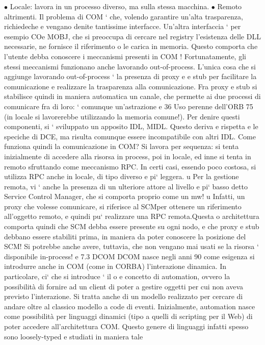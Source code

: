 \documentclass[a4paper,12pt]{article}
\begin{document}
$\bullet$ Locale: lavora in un processo diverso, ma sulla stessa macchina.
$\bullet$ Remoto altrimenti.
Il problema di COM ` che, volendo garantire un'alta trasparenza, richiedeche
e
vengano denite tantissime interfacce. Un'altra interfaccia ` per esempio COe
MOBJ, che si preoccupa di cercare nel registry l'esistenza delle DLL necessarie,
ne fornisce il riferimento o le carica in memoria. Questo comporta che l'utente debba conoscere i meccanismi presenti in
COM ! Fortunatamente, gli stessi
meccanismi funzionano anche lavorando out-of-process.
L'unica cosa che si aggiunge lavorando out-of-process ` la presenza di proxy
e
e stub per facilitare la comunicazione e realizzare la trasparenza alla comunicazione. Fra proxy e stub si stabilisce
quindi in maniera automatica un canale,
che permette ai due processi di comunicare fra di loro: ` comunque un'astrazione
e
36 Uso
perenne dell'ORB
75
(in locale si lavorerebbe utilizzando la memoria comune!). Per denire questi
componenti, si ` sviluppato un apposito IDL, MIDL. Questo deriva e rispetta
e
le speciche di DCE, ma risulta comunque essere incompatibile con altri IDL.
Come funziona quindi la comunicazione in COM? Si lavora per sequenza: si
tenta inizialmente di accedere alla risorsa in process, poi in locale, ed inne si
tenta in remoto sfruttando come meccanismo RPC. In certi casi, essendo poco
costosa, si utilizza RPC anche in locale, di tipo diverso e pi` leggera.
u
Per la gestione remota, vi ` anche la presenza di un ulteriore attore al livello
e
pi` basso detto Service Control Manager, che si comporta proprio come un mw!
u
Infatti, un proxy che volesse comunicare, si riferisce al SCMper ottenere un
riferimento all'oggetto remoto, e quindi pu` realizzare una RPC remota.Questa
o
architettura comporta quindi che SCM debba essere presente su ogni nodo, e
che proxy e stub debbano essere stabiliti prima, in maniera da poter conoscere
la posizione del SCM! Si potrebbe anche avere, tuttavia, che non vengano mai
usati se la risorsa ` disponibile in-process!
e
7.3
DCOM
DCOM nasce negli anni 90 come esigenza si introdurre anche in COM (come
in CORBA) l'interazione dinamica. In particolare, ci` che si introduce ` il
o
e
concetto di automation, ovvero la possibilità di fornire ad un client di poter
a
gestire oggetti per cui non aveva previsto l'interazione. Si tratta anche di un
modello realizzato per cercare di andare oltre al classico modello a code di eventi.
Inizialmente, automation nasce come possibilità per linguaggi dinamici (tipo
a
quelli di scripting per il Web) di poter accedere all'architettura COM. Questo
genere di linguaggi infatti spesso sono loosely-typed e studiati in maniera tale
\end{document}

